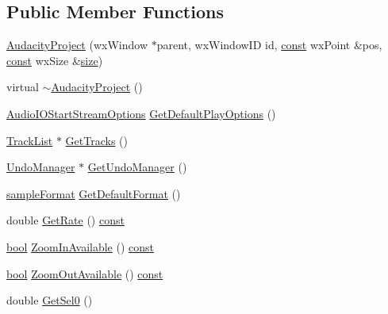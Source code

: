 \subsection*{Public Member Functions}
\begin{DoxyCompactItemize}
\item 
\hyperlink{class_audacity_project_a23eca8d8cf7b00514867ed496091c65f}{Audacity\+Project} (wx\+Window $\ast$parent, wx\+Window\+ID id, \hyperlink{getopt1_8c_a2c212835823e3c54a8ab6d95c652660e}{const} wx\+Point \&pos, \hyperlink{getopt1_8c_a2c212835823e3c54a8ab6d95c652660e}{const} wx\+Size \&\hyperlink{group__lavu__mem_ga854352f53b148adc24983a58a1866d66}{size})
\item 
virtual \hyperlink{class_audacity_project_a26d908ec8b9546c1a118d5bebafc8590}{$\sim$\+Audacity\+Project} ()
\item 
\hyperlink{struct_audio_i_o_start_stream_options}{Audio\+I\+O\+Start\+Stream\+Options} \hyperlink{class_audacity_project_aab258cf005aa9ef7df136e8491590c27}{Get\+Default\+Play\+Options} ()
\item 
\hyperlink{class_track_list}{Track\+List} $\ast$ \hyperlink{class_audacity_project_afaedffb2cf04d79c1ee7ff5f941b3644}{Get\+Tracks} ()
\item 
\hyperlink{class_undo_manager}{Undo\+Manager} $\ast$ \hyperlink{class_audacity_project_a874ee01ca62d42c74f287b5c5bbcdb8d}{Get\+Undo\+Manager} ()
\item 
\hyperlink{include_2audacity_2_types_8h_a9938d2e2f6adef23e745cd80ef379792}{sample\+Format} \hyperlink{class_audacity_project_aa714321a887cd650140df0ba7fcea0ac}{Get\+Default\+Format} ()
\item 
double \hyperlink{class_audacity_project_a73a477249a9746f99bd0f72e9d9fe531}{Get\+Rate} () \hyperlink{getopt1_8c_a2c212835823e3c54a8ab6d95c652660e}{const} 
\item 
\hyperlink{mac_2config_2i386_2lib-src_2libsoxr_2soxr-config_8h_abb452686968e48b67397da5f97445f5b}{bool} \hyperlink{class_audacity_project_a640cb9e4b11d6e2fba984408251616e4}{Zoom\+In\+Available} () \hyperlink{getopt1_8c_a2c212835823e3c54a8ab6d95c652660e}{const} 
\item 
\hyperlink{mac_2config_2i386_2lib-src_2libsoxr_2soxr-config_8h_abb452686968e48b67397da5f97445f5b}{bool} \hyperlink{class_audacity_project_ac22bd96da006ff4893b67c832ef463fd}{Zoom\+Out\+Available} () \hyperlink{getopt1_8c_a2c212835823e3c54a8ab6d95c652660e}{const} 
\item 
double \hyperlink{class_audacity_project_a9f4b0e77b655711fb8f2eb09bcba31f7}{Get\+Sel0} ()

\end{DoxyCompactItemize}
